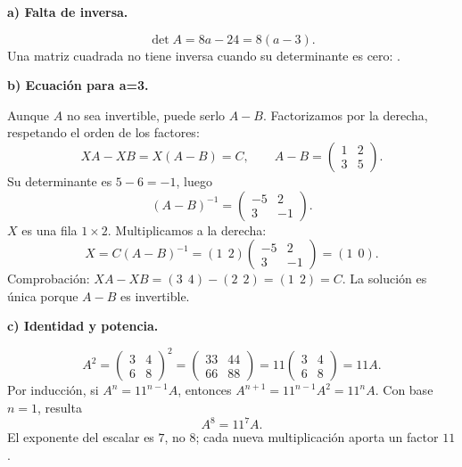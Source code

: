 \textbf{a) Falta de inversa.}\par\nopagebreak[4]
\[
\det A=8a-24=8(a-3).
\]
Una matriz cuadrada no tiene inversa cuando su determinante es cero: .

\textbf{b) Ecuación para a=3.}\par\nopagebreak[4]
Aunque $A$ no sea invertible, puede serlo $A-B$. Factorizamos por la derecha, respetando el orden de los factores:
\[
XA-XB=X(A-B)=C,\qquad
A-B=\begin{pmatrix}1&2\\3&5\end{pmatrix}.
\]
Su determinante es $5-6=-1$, luego
\[
(A-B)^{-1}=\begin{pmatrix}-5&2\\3&-1\end{pmatrix}.
\]
$X$ es una fila $1\times2$. Multiplicamos a la derecha:
\[
X=C(A-B)^{-1}=(1\ \ 2)\begin{pmatrix}-5&2\\3&-1\end{pmatrix}
=\boxed{(1\ \ 0).}
\]
Comprobación: $XA-XB=(3\ \ 4)-(2\ \ 2)=(1\ \ 2)=C$. La solución es única porque $A-B$ es invertible.

\textbf{c) Identidad y potencia.}\par\nopagebreak[4]
\[
A^2=\begin{pmatrix}3&4\\6&8\end{pmatrix}^2
=\begin{pmatrix}33&44\\66&88\end{pmatrix}
=11\begin{pmatrix}3&4\\6&8\end{pmatrix}=11A.
\]
Por inducción, si $A^n=11^{n-1}A$, entonces $A^{n+1}=11^{n-1}A^2=11^nA$. Con base $n=1$, resulta
\[
\boxed{A^8=11^7A.}
\]
El exponente del escalar es $7$, no $8$; cada nueva multiplicación aporta un factor $11$.
